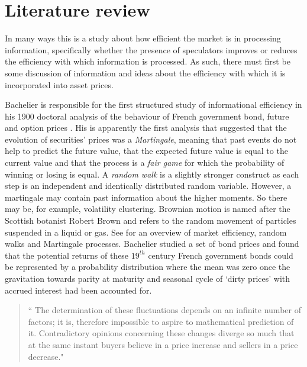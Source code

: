 \documentclass[12pt, a4paper, oneside]{article} %
\begin{document}
\section{Literature review}  
In many ways this is a study about how efficient the market  is in processing information, specifically whether the presence of speculators improves or reduces the efficiency with which information is processed.  As such, there must first be some discussion of information and ideas about the efficiency with which it is incorporated into asset prices.  

Bachelier is responsible for the first structured  study of informational efficiency in his 1900 doctoral analysis of the behaviour of French government bond, future and option prices \citep{Bachelier1900}.  His is apparently the first analysis that suggested that the evolution of securities' prices was a \emph{Martingale}, meaning that past events do not help to predict the future value, that the expected future value is equal to the current value and that the process is a \emph{fair game} for which the probability of winning or losing is equal.  A \emph{random walk} is a slightly stronger construct as each step is an independent and identically distributed random variable.  However, a martingale may contain past information about the higher moments.   So there may be, for example, volatility clustering. Brownian motion is named after the Scottish botanist Robert Brown and refers to the random movement of particles suspended in a liquid or gas.  See \citep{LeRoyMartingales} for an overview of market efficiency, random walks and Martingale processes.  Bachelier studied a set of bond prices and found that the potential returns of these $19^{th}$ century French government bonds could be represented by a probability distribution where the mean was zero once the gravitation towards parity at maturity and seasonal cycle of `dirty prices' with accrued interest had been accounted for.  

\begin{quotation}
`` The determination of these fluctuations depends on an infinite number of factors; it is, therefore impossible to aspire to mathematical prediction of it.  Contradictory opinions concerning these changes diverge so much that at the same instant buyers believe in a price increase and sellers in a price decrease."
\end{quotation}

\citep[p. 17]{Bachelier1900}  
\end{document}
